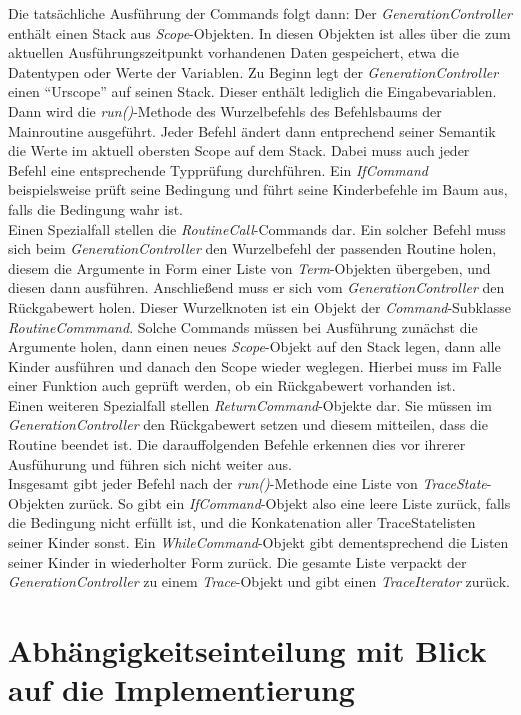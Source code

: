 \documentclass[parskip=full]{scrartcl}
\begin{document}
Die tatsächliche Ausführung der Commands folgt dann: Der \textit{GenerationController} enthält einen Stack aus \textit{Scope}-Objekten. In diesen Objekten ist alles über die zum aktuellen Ausführungszeitpunkt vorhandenen Daten gespeichert, etwa die Datentypen oder Werte der Variablen. Zu Beginn legt der \textit{GenerationController} einen \enquote{Urscope} auf seinen Stack. Dieser enthält lediglich die Eingabevariablen. Dann wird die \textit{run()}-Methode des Wurzelbefehls des Befehlsbaums der Mainroutine ausgeführt. Jeder Befehl ändert dann entprechend seiner Semantik die Werte im aktuell obersten Scope auf dem Stack. Dabei muss auch jeder Befehl eine entsprechende Typprüfung durchführen. Ein \textit{IfCommand} beispielsweise prüft seine Bedingung und führt seine Kinderbefehle im Baum aus, falls die Bedingung wahr ist. \\
Einen Spezialfall stellen die \textit{RoutineCall}-Commands dar. Ein solcher Befehl muss sich beim \textit{GenerationController} den Wurzelbefehl der passenden Routine holen, diesem die Argumente in Form einer Liste von \textit{Term}-Objekten übergeben, und diesen dann ausführen. Anschließend muss er sich vom \textit{GenerationController} den Rückgabewert holen. Dieser Wurzelknoten ist ein Objekt der \textit{Command}-Subklasse \textit{RoutineCommmand}. Solche Commands müssen bei Ausführung zunächst die Argumente holen, dann einen neues \textit{Scope}-Objekt auf den Stack legen, dann alle Kinder ausführen und danach den Scope wieder weglegen. Hierbei muss im Falle einer Funktion auch geprüft werden, ob ein Rückgabewert vorhanden ist.\\
Einen weiteren Spezialfall stellen \textit{ReturnCommand}-Objekte dar. Sie müssen im \textit{GenerationController} den Rückgabewert setzen und diesem mitteilen, dass die Routine beendet ist. Die darauffolgenden Befehle erkennen dies vor ihrerer Ausfühurung und führen sich nicht weiter aus. \\
Insgesamt gibt jeder Befehl nach der \textit{run()}-Methode eine Liste von  \textit{TraceState}-Objekten zurück. So gibt ein \textit{IfCommand}-Objekt also eine leere Liste zurück, falls die Bedingung nicht erfüllt ist, und die Konkatenation aller TraceStatelisten seiner Kinder sonst. Ein \textit{WhileCommand}-Objekt gibt dementsprechend die Listen seiner Kinder in wiederholter Form zurück. Die gesamte Liste verpackt der \textit{GenerationController} zu einem \textit{Trace}-Objekt und gibt einen \textit{TraceIterator} zurück.
\section{Abhängigkeitseinteilung mit Blick auf die Implementierung}
\end{document}
